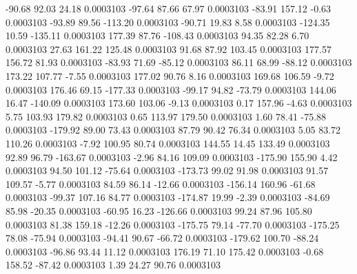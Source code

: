       -90.68       92.03       24.18     0.0003103
      -97.64       87.66       67.97     0.0003103
      -83.91      157.12       -0.63     0.0003103
      -93.89       89.56     -113.20     0.0003103
      -90.71       19.83        8.58     0.0003103
     -124.35       10.59     -135.11     0.0003103
      177.39       87.76     -108.43     0.0003103
       94.35       82.28        6.70     0.0003103
       27.63      161.22      125.48     0.0003103
       91.68       87.92      103.45     0.0003103
      177.57      156.72       81.93     0.0003103
      -83.93       71.69      -85.12     0.0003103
       86.11       68.99      -88.12     0.0003103
      173.22      107.77       -7.55     0.0003103
      177.02       90.76        8.16     0.0003103
      169.68      106.59       -9.72     0.0003103
      176.46       69.15     -177.33     0.0003103
      -99.17       94.82      -73.79     0.0003103
      144.06       16.47     -140.09     0.0003103
      173.60      103.06       -9.13     0.0003103
        0.17      157.96       -4.63     0.0003103
        5.75      103.93      179.82     0.0003103
        0.65      113.97      179.50     0.0003103
        1.60       78.41      -75.88     0.0003103
     -179.92       89.00       73.43     0.0003103
       87.79       90.42       76.34     0.0003103
        5.05       83.72      110.26     0.0003103
       -7.92      100.95       80.74     0.0003103
      144.55       14.45      133.49     0.0003103
       92.89       96.79     -163.67     0.0003103
       -2.96       84.16      109.09     0.0003103
     -175.90      155.90        4.42     0.0003103
       94.50      101.12      -75.64     0.0003103
     -173.73       99.02       91.98     0.0003103
       91.57      109.57       -5.77     0.0003103
       84.59       86.14      -12.66     0.0003103
     -156.14      160.96      -61.68     0.0003103
      -99.37      107.16       84.77     0.0003103
     -174.87       19.99       -2.39     0.0003103
      -84.69       85.98      -20.35     0.0003103
      -60.95       16.23     -126.66     0.0003103
       99.24       87.96      105.80     0.0003103
       81.38      159.18      -12.26     0.0003103
     -175.75       79.14      -77.70     0.0003103
     -175.25       78.08      -75.94     0.0003103
      -94.41       90.67      -66.72     0.0003103
     -179.62      100.70      -88.24     0.0003103
      -96.86       93.44       11.12     0.0003103
      176.19       71.10      175.42     0.0003103
       -0.68      158.52      -87.42     0.0003103
        1.39       24.27       90.76     0.0003103
